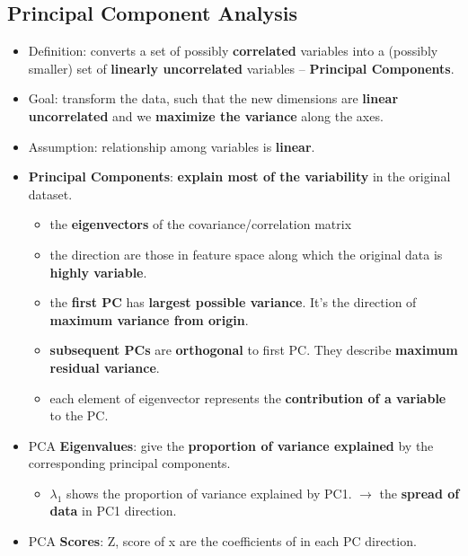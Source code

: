 \subsection{Principal Component Analysis}
\begin{itemize}
	\item Definition: converts a set of possibly \textbf{correlated} variables into a (possibly smaller) set of \textbf{linearly uncorrelated} variables -- \textbf{Principal Components}.
	
	\item Goal: transform the data, such that the new dimensions are \textbf{linear uncorrelated} and we \textbf{maximize the variance} along the axes.
	\item Assumption: relationship among variables is \textbf{linear}.
	\item \textbf{Principal Components}: \textbf{explain most of the variability} in the original dataset. 
	\begin{itemize}
		\item the \textbf{eigenvectors} of the covariance/correlation matrix
		\item the direction are those in feature space along which the original data is \textbf{highly variable}.
		\item the \textbf{first PC} has \textbf{largest possible variance}.  It's the direction of \textbf{maximum variance from origin}.
		\item \textbf{subsequent PCs} are \textbf{orthogonal} to first PC. They describe \textbf{maximum residual variance}.
		\item each element of eigenvector represents the \textbf{contribution of a variable} to the PC.
	\end{itemize}
	\item PCA \textbf{Eigenvalues}: give the \textbf{proportion of variance explained} by the corresponding principal components. 
	\begin{itemize}
		\item $\lambda_1$ shows the proportion of variance explained by PC1. $\rightarrow$ the \textbf{spread of data} in PC1 direction.
	\end{itemize}
	\item PCA \textbf{Scores}: Z, score of x are the coefficients of in each PC direction. 
\end{itemize}

